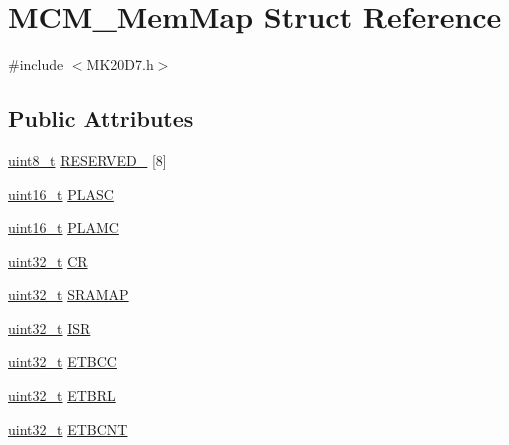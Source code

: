 \hypertarget{struct_m_c_m___mem_map}{}\section{M\+C\+M\+\_\+\+Mem\+Map Struct Reference}
\label{struct_m_c_m___mem_map}


{\ttfamily \#include $<$M\+K20\+D7.\+h$>$}

\subsection*{Public Attributes}
\begin{DoxyCompactItemize}
\item 
\hyperlink{_p_e___types_8h_aba7bc1797add20fe3efdf37ced1182c5}{uint8\+\_\+t} \hyperlink{struct_m_c_m___mem_map_a236367d6d2f66f8132667a66f231634e}{R\+E\+S\+E\+R\+V\+E\+D\+\_} \mbox{[}8\mbox{]}
\item 
\hyperlink{_p_e___types_8h_a1f1825b69244eb3ad2c7165ddc99c956}{uint16\+\_\+t} \hyperlink{struct_m_c_m___mem_map_ad68f64d82524bb0b181a837967b8e248}{P\+L\+A\+SC}
\item 
\hyperlink{_p_e___types_8h_a1f1825b69244eb3ad2c7165ddc99c956}{uint16\+\_\+t} \hyperlink{struct_m_c_m___mem_map_a7d749b910777a6b67ea94f2379c628ee}{P\+L\+A\+MC}
\item 
\hyperlink{_p_e___types_8h_a33594304e786b158f3fb30289278f5af}{uint32\+\_\+t} \hyperlink{struct_m_c_m___mem_map_a7bc89132595b7fb75318b4ba285957cd}{CR}
\item 
\hyperlink{_p_e___types_8h_a33594304e786b158f3fb30289278f5af}{uint32\+\_\+t} \hyperlink{struct_m_c_m___mem_map_a7e427ba6d40677a375476077fd051b04}{S\+R\+A\+M\+AP}
\item 
\hyperlink{_p_e___types_8h_a33594304e786b158f3fb30289278f5af}{uint32\+\_\+t} \hyperlink{struct_m_c_m___mem_map_a94394dd07a739357ea5163369af0fbb6}{I\+SR}
\item 
\hyperlink{_p_e___types_8h_a33594304e786b158f3fb30289278f5af}{uint32\+\_\+t} \hyperlink{struct_m_c_m___mem_map_a2d99ca168bd0840c724da29daca2c355}{E\+T\+B\+CC}
\item 
\hyperlink{_p_e___types_8h_a33594304e786b158f3fb30289278f5af}{uint32\+\_\+t} \hyperlink{struct_m_c_m___mem_map_ae4d8c3979038482e324840c3bfa856d7}{E\+T\+B\+RL}
\item 
\hyperlink{_p_e___types_8h_a33594304e786b158f3fb30289278f5af}{uint32\+\_\+t} \hyperlink{struct_m_c_m___mem_map_adfc2ce9910687ae02d33cb7a1584a919}{E\+T\+B\+C\+NT}
\end{DoxyCompactItemize}


